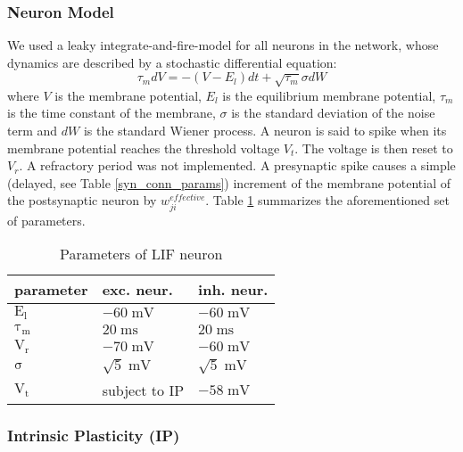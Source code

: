 \documentclass[10pt,a4paper]{article}
\begin{document}
\subsubsection{Neuron Model}

We used a leaky integrate-and-fire-model for all neurons in the network, whose dynamics are described by a stochastic differential equation:
\begin{equation}
{\tau_m}dV = -(V-E_l)dt + \sqrt{\tau_m} \sigma dW
\label{LIF_Dynamics}
\end{equation}
where $V$ is the membrane potential, $E_l$ is the equilibrium membrane potential, $\tau_m$ is the time constant of the membrane, $\sigma$ is the standard deviation of the noise term and $dW$ is the standard Wiener process. A neuron is said to spike when its membrane potential reaches the threshold voltage $V_t$. The voltage is then reset to $V_r$. A refractory period was not implemented. A presynaptic spike causes a simple (delayed, see Table \ref{syn_conn_params}) increment of the membrane potential of the postsynaptic neuron by $w^{effective}_{ji}$. Table \ref{LIF_neuron_params} summarizes the aforementioned set of parameters.
\begin{table}
\begin{tabular}{|l|l|l|}
\hline
\textbf{parameter} & \textbf{exc. neur.} & \textbf{inh. neur.}\\ \hline
$\mathrm{E_l}$ & $\mathrm{-60\;mV}$ & $\mathrm{-60\;mV}$ \\ \hline
$\mathrm{\tau_m}$ & $\mathrm{20\;ms}$ & $\mathrm{20\;ms}$ \\ \hline
$\mathrm{V_r}$ & $\mathrm{-70\;mV}$ & $\mathrm{-60\;mV}$ \\ \hline
$\mathrm{\sigma}$ & $\mathrm{\sqrt{5}\;mV}$ & $\mathrm{\sqrt{5}\;mV}$ \\ \hline
$\mathrm{V_t}$ & subject to IP & $\mathrm{-58\;mV}$ \\ 
\hline
\end{tabular}
\caption{Parameters of LIF neuron}
\label{LIF_neuron_params}
\end{table}   

\subsubsection{Intrinsic Plasticity (IP)}
\end{document}

